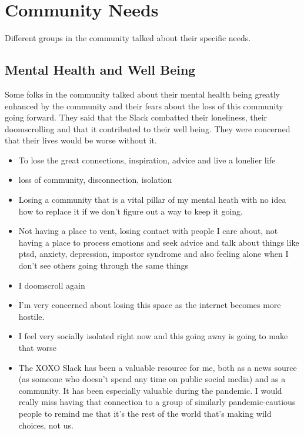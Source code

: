 \documentclass[
]{book}
\providecommand{\tightlist}{%
  \setlength{\itemsep}{0pt}\setlength{\parskip}{0pt}}
\begin{document}
\section{Community Needs}\label{community-needs}

Different groups in the community talked about their specific needs.

\subsection{Mental Health and Well Being}\label{mental-health-and-well-being}

Some folks in the community talked about their mental health being greatly enhanced by the community and their fears about the loss of this community going forward. They said that the Slack combatted their loneliness, their doomscrolling and that it contributed to their well being. They were concerned that their lives would be worse without it.

\begin{itemize}
\tightlist
\item
  To lose the great connections, inspiration, advice and live a lonelier life
\item
  loss of community, disconnection, isolation
\item
  Losing a community that is a vital pillar of my mental heath with no idea how to replace it if we don't figure out a way to keep it going.
\item
  Not having a place to vent, losing contact with people I care about, not having a place to process emotions and seek advice and talk about things like ptsd, anxiety, depression, impostor syndrome and also feeling alone when I don't see others going through the same things
\item
  I doomscroll again
\item
  I'm very concerned about losing this space as the internet becomes more hostile.
\item
  I feel very socially isolated right now and this going away is going to make that worse
\item
  The XOXO Slack has been a valuable resource for me, both as a news source (as someone who doesn't spend any time on public social media) and as a community. It has been especially valuable during the pandemic. I would really miss having that connection to a group of similarly pandemic-cautious people to remind me that it's the rest of the world that's making wild choices, not us.
\end{itemize}
\end{document}
